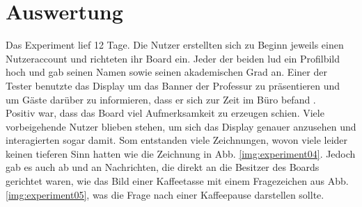 \section{Auswertung}\label{AuswertungVorstudie}
Das Experiment lief 12 Tage. Die Nutzer erstellten sich zu Beginn jeweils einen Nutzeraccount und richteten ihr Board ein. Jeder der beiden lud ein Profilbild hoch und gab seinen Namen sowie seinen akademischen Grad an.
Einer der Tester benutzte das Display um das Banner der Professur zu präsentieren  und um Gäste \bspw darüber zu informieren, dass er sich zur Zeit im Büro befand .
\\
Positiv war, dass das Board viel Aufmerksamkeit zu erzeugen schien. Viele vorbeigehende Nutzer blieben stehen, um sich das Display genauer anzusehen und interagierten sogar damit. Som entstanden viele Zeichnungen, wovon viele leider keinen tieferen Sinn hatten wie \bspw die Zeichnung in Abb. \ref{img:experiment04}. Jedoch gab es auch ab und an Nachrichten, die direkt an die Besitzer des Boards gerichtet waren, wie das Bild einer Kaffeetasse mit einem Fragezeichen aus Abb. \ref{img:experiment05}, was die Frage nach einer Kaffeepause darstellen sollte.
